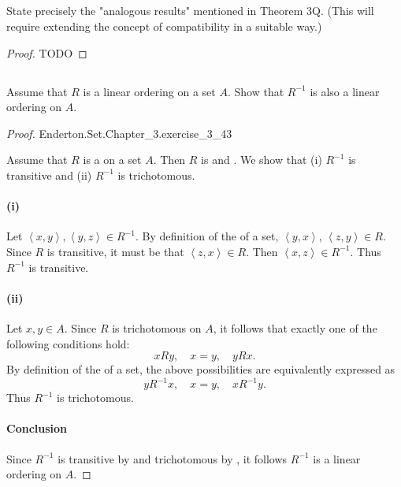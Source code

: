 \documentclass{report}
\newcommand{\pair}[1]{\left< #1 \right>}
\begin{document}
\subsection{}%

State precisely the "analogous results" mentioned in Theorem 3Q.
(This will require extending the concept of compatibility in a suitable way.)

\begin{proof}

  TODO

\end{proof}

\subsection{}%

Assume that $R$ is a linear ordering on a set $A$.
Show that $R^{-1}$ is also a linear ordering on $A$.

\begin{proof}

    {Enderton.Set.Chapter\_3.exercise\_3\_43}

  Assume that $R$ is a  on a set $A$.
  Then $R$ is  and .
  We show that (i) $R^{-1}$ is transitive and (ii) $R^{-1}$ is trichotomous.

  \paragraph{(i)}%

    Let $\pair{x, y}, \pair{y, z} \in R^{-1}$.
    By definition of the  of a set,
      $\pair{y, x}$, $\pair{z, y} \in R$.
    Since $R$ is transitive, it must be that $\pair{z, x} \in R$.
    Then $\pair{x, z} \in R^{-1}$.
    Thus $R^{-1}$ is transitive.

  \paragraph{(ii)}%

    Let $x, y \in A$.
    Since $R$ is trichotomous on $A$, it follows that exactly one of the
      following conditions hold: $$xRy, \quad x = y, \quad yRx.$$
    By definition of the  of a set, the above possibilities
      are equivalently expressed as
      $$yR^{-1}x, \quad x = y, \quad xR^{-1}y.$$
    Thus $R^{-1}$ is trichotomous.

  \paragraph{Conclusion}%

    Since $R^{-1}$ is transitive by  and
      trichotomous by , it follows $R^{-1}$ is a
      linear ordering on $A$.

\end{proof}
\end{document}
